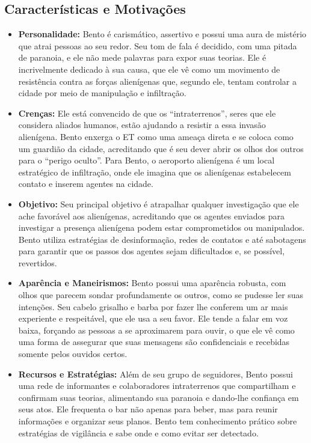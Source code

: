 \subsection*{Características e Motivações}
\begin{itemize}
    \item \textbf{Personalidade:} Bento é carismático, assertivo e possui uma aura de mistério que atrai pessoas ao seu redor. Seu tom de fala é decidido, com uma pitada de paranoia, e ele não mede palavras para expor suas teorias. Ele é incrivelmente dedicado à sua causa, que ele vê como um movimento de resistência contra as forças alienígenas que, segundo ele, tentam controlar a cidade por meio de manipulação e infiltração.

    \item \textbf{Crenças:} Ele está convencido de que os ``intraterrenos'', seres que ele considera aliados humanos, estão ajudando a resistir a essa invasão alienígena. Bento enxerga o ET como uma ameaça direta e se coloca como um guardião da cidade, acreditando que é seu dever abrir os olhos dos outros para o ``perigo oculto''. Para Bento, o aeroporto alienígena é um local estratégico de infiltração, onde ele imagina que os alienígenas estabelecem contato e inserem agentes na cidade.

    \item \textbf{Objetivo:} Seu principal objetivo é atrapalhar qualquer investigação que ele ache favorável aos alienígenas, acreditando que os agentes enviados para investigar a presença alienígena podem estar comprometidos ou manipulados. Bento utiliza estratégias de desinformação, redes de contatos e até sabotagens para garantir que os passos dos agentes sejam dificultados e, se possível, revertidos.

    \item \textbf{Aparência e Maneirismos:} Bento possui uma aparência robusta, com olhos que parecem sondar profundamente os outros, como se pudesse ler suas intenções. Seu cabelo grisalho e barba por fazer lhe conferem um ar mais experiente e respeitável, que ele usa a seu favor. Ele tende a falar em voz baixa, forçando as pessoas a se aproximarem para ouvir, o que ele vê como uma forma de assegurar que suas mensagens são confidenciais e recebidas somente pelos ouvidos certos.

    \item \textbf{Recursos e Estratégias:} Além de seu grupo de seguidores, Bento possui uma rede de informantes e colaboradores intraterrenos que compartilham e confirmam suas teorias, alimentando sua paranoia e dando-lhe confiança em seus atos. Ele frequenta o bar não apenas para beber, mas para reunir informações e organizar seus planos. Bento tem conhecimento prático sobre estratégias de vigilância e sabe onde e como evitar ser detectado.
\end{itemize}

